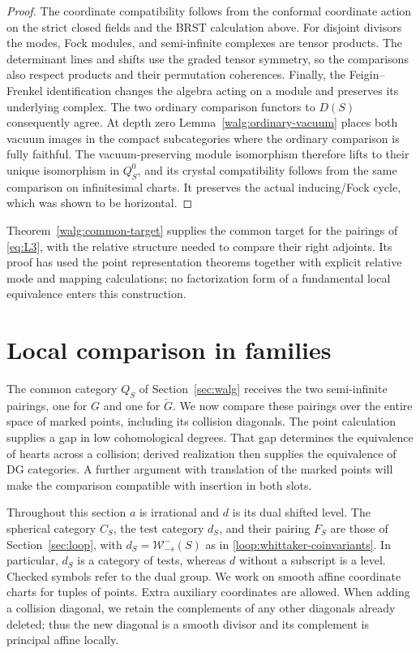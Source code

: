 \documentclass[11pt]{article}
\numberwithin{equation}{section}
\theoremstyle{definition}
\theoremstyle{remark}
\begin{document}
\begin{proof}
The coordinate compatibility follows from the conformal coordinate
action on the strict closed fields and the BRST calculation above.
For disjoint divisors the modes, Fock modules, and semi-infinite
complexes are tensor products.  The determinant lines and shifts use
the graded tensor symmetry, so the comparisons also respect products
and their permutation coherences.  Finally, the Feigin--Frenkel
identification changes the algebra acting on a module and preserves
its underlying complex.  The two ordinary comparison functors to
\(D(S)\) consequently agree.  At depth zero
Lemma~\ref{walg:ordinary-vacuum} places both vacuum images in the compact subcategories where the ordinary comparison is
fully faithful.  The vacuum-preserving module isomorphism therefore
lifts to their unique isomorphism in \(Q_S^0\), and its crystal
compatibility follows from the same comparison on infinitesimal
charts.  It preserves the actual inducing/Fock cycle, which was
shown to be horizontal.
\end{proof}

Theorem~\ref{walg:common-target} supplies the common target for the
pairings of \eqref{eq:L3}, with the relative structure needed to
compare their right adjoints.  Its proof has used the point
representation theorems together with explicit relative mode and
mapping calculations; no factorization form of a fundamental local
equivalence enters this construction.

\section{Local comparison in families}\label{sec:local}

The common category $Q_S$ of Section~\ref{sec:walg} receives the two
semi-infinite pairings, one for $G$ and one for $\check G$.  We now compare
these pairings over the entire space of marked points, including its
collision diagonals.  The point calculation supplies a gap in low
cohomological degrees.  That gap determines the equivalence of hearts
across a collision; derived realization then supplies the equivalence of
DG categories.  A further argument with translation of the marked points
will make the comparison compatible with insertion in both slots.

Throughout this section $a$ is irrational and $d$ is its dual shifted
level.  The spherical category $C_S$, the test category $d_S$, and their
pairing $F_S$ are those of Section~\ref{sec:loop}, with
$d_S=\mathcal W_{-s}^-(S)$ as in
\eqref{loop:whittaker-coinvariants}.  In particular, $d_S$ is a category of tests,
whereas $d$ without a subscript is a level.  Checked symbols refer to the
dual group.  We work on smooth affine coordinate charts for tuples of
points.  Extra auxiliary coordinates are allowed.  When adding a
collision diagonal, we retain the complements of any other diagonals
already deleted; thus the new diagonal is a smooth divisor and its
complement is principal affine locally.
\end{document}
